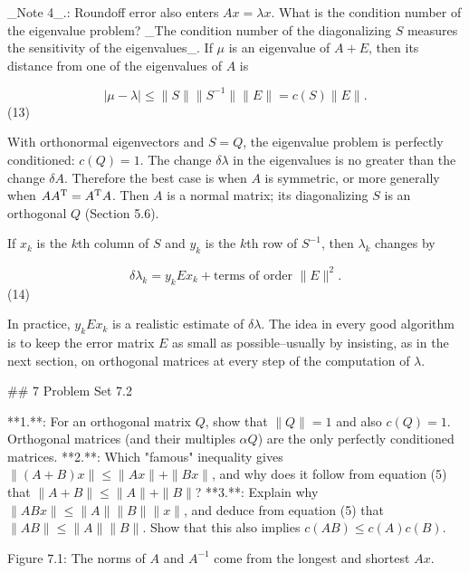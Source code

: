 _Note 4_.: Roundoff error also enters \(Ax=\lambda x\). What is the condition number of the eigenvalue problem? _The condition number of the diagonalizing \(S\) measures the sensitivity of the eigenvalues_. If \(\mu\) is an eigenvalue of \(A+E\), then its distance from one of the eigenvalues of \(A\) is

\[|\mu-\lambda|\leq\|S\|\|S^{-1}\|\|E\|=c(S)\|E\|.\] (13)

With orthonormal eigenvectors and \(S=Q\), the eigenvalue problem is perfectly conditioned: \(c(Q)=1\). The change \(\delta\lambda\) in the eigenvalues is no greater than the change \(\delta A\). Therefore the best case is when \(A\) is symmetric, or more generally when \(AA^{\rm T}=A^{\rm T}A\). Then \(A\) is a normal matrix; its diagonalizing \(S\) is an orthogonal \(Q\) (Section 5.6).

If \(x_{k}\) is the \(k\)th column of \(S\) and \(y_{k}\) is the \(k\)th row of \(S^{-1}\), then \(\lambda_{k}\) changes by

\[\delta\lambda_{k}=y_{k}Ex_{k}+\text{terms of order }\|E\|^{2}.\] (14)

In practice, \(y_{k}Ex_{k}\) is a realistic estimate of \(\delta\lambda\). The idea in every good algorithm is to keep the error matrix \(E\) as small as possible--usually by insisting, as in the next section, on orthogonal matrices at every step of the computation of \(\lambda\).

## 7 Problem Set 7.2

**1.**: For an orthogonal matrix \(Q\), show that \(\|Q\|=1\) and also \(c(Q)=1\). Orthogonal matrices (and their multiples \(\alpha Q\)) are the only perfectly conditioned matrices.
**2.**: Which "famous" inequality gives \(\|(A+B)x\|\leq\|Ax\|+\|Bx\|\), and why does it follow from equation (5) that \(\|A+B\|\leq\|A\|+\|B\|\)?
**3.**: Explain why \(\|ABx\|\leq\|A\|\|B\|\|x\|\), and deduce from equation (5) that \(\|AB\|\leq\|A\|\|B\|\). Show that this also implies \(c(AB)\leq c(A)c(B)\).

Figure 7.1: The norms of \(A\) and \(A^{-1}\) come from the longest and shortest \(Ax\).

 